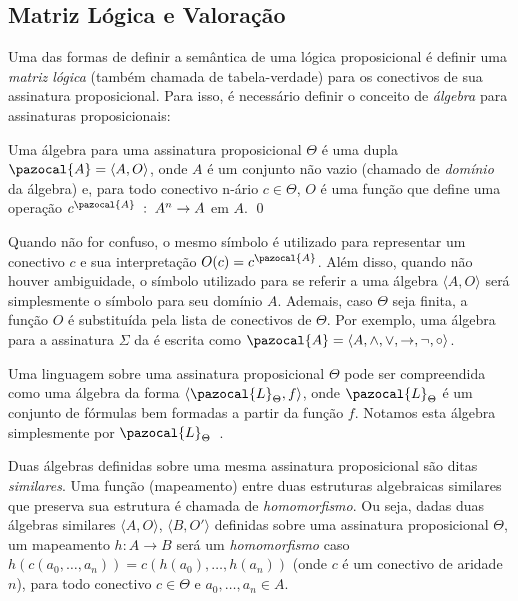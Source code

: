     \subsection{Matriz Lógica e Valoração}
        Uma das formas de definir a semântica de uma lógica proposicional é definir uma \textit{matriz lógica} (também chamada de tabela-verdade) para os conectivos de sua assinatura proposicional. Para isso, é necessário definir o conceito de \textit{álgebra} para assinaturas proposicionais:
        \begin{definicao}
        \label{def:algebra}
            Uma álgebra para uma assinatura proposicional $\Theta$ é uma dupla $\pazocal{A} = \langle A, O \rangle$, onde $A$ é um conjunto não vazio (chamado de \textit{domínio} da álgebra) e, para todo conectivo n-ário $c \in \Theta$,  $O$ é uma função que define uma operação $c^{\pazocal{A}} \; : \; A^{n} \rightarrow A$ em $A$. \qed{}
        \end{definicao}

        Quando não for confuso, o mesmo símbolo é utilizado para representar um conectivo $c$ e sua interpretação $O(c) = c^{\pazocal{A}}$. Além disso, quando não houver ambiguidade, o símbolo utilizado para se referir a uma álgebra $\langle A, O \rangle$ será simplesmente o símbolo para seu domínio $A$. Ademais, caso $\Theta$ seja finita, a função $O$ é substituída pela lista de conectivos de $\Theta$. Por exemplo, uma álgebra para a assinatura $\Sigma$ da \lfium{} é escrita como $\pazocal{A} = \langle A,\land, \lor, \rightarrow, \neg, \circ \rangle$.

        \begin{observacao}
            Uma linguagem sobre uma assinatura proposicional $\Theta$ pode ser compreendida como uma álgebra da forma $\langle \pazocal{L}_{\Theta}, f \rangle$, onde $\pazocal{L}_{\Theta}$ é um conjunto de fórmulas bem formadas a partir da função $f$. Notamos esta álgebra simplesmente por $\pazocal{L}_{\Theta}$~\cite{Sikorski1966-SIKAOF}.
        \end{observacao}

        Duas álgebras definidas sobre uma mesma assinatura proposicional são ditas \textit{similares}. Uma função (mapeamento) entre duas estruturas algebraicas similares que preserva sua estrutura é chamada de \textit{homomorfismo}. Ou seja, dadas duas álgebras similares $\langle A, O \rangle$, $\langle B, O' \rangle$ definidas sobre uma assinatura proposicional $\Theta$, um mapeamento $h : A \rightarrow B$ será um \textit{homomorfismo} caso $h(c(a_{0},\ldots, a_{n})) = c(h(a_{0}),\ldots, h(a_{n}))$ (onde $c$ é um conectivo de aridade $n$), para todo conectivo $c \in \Theta$ e $a_{0},\ldots,a_{n} \in A$. 

